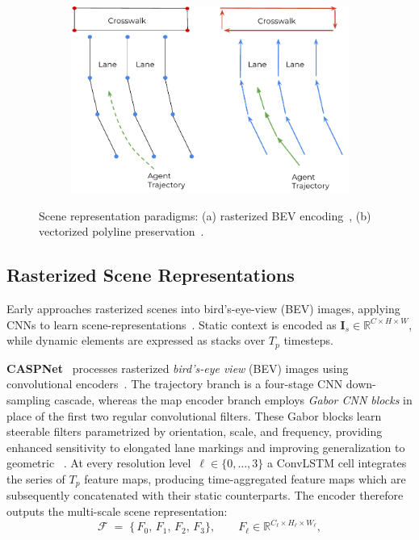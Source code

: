 \begin{figure}[H]
\begin{subfigure}[t]{0.35\textwidth}
    \label{fig:rasterized}
\end{subfigure}
\hfill
\begin{subfigure}[t]{0.37\textwidth}
    \centering
    \includegraphics[width=\textwidth]{figures/vectornet-2020-vector-repr.pdf}
    \label{fig:vectorized}
\end{subfigure}
\caption{Scene representation paradigms: (a) rasterized BEV encoding~\cite{caspnetSchaefer2022}, (b) vectorized polyline preservation~\cite{gao2020vectornet}.}
\label{fig:scene_representations}
\end{figure}

\subsection{Rasterized Scene Representations}
Early approaches rasterized scenes into bird's-eye-view (BEV) images, applying CNNs to learn scene-representations~\cite{cui2019multimodal,chai2019multipath}. Static context is encoded as \(\mathbf{I}_s \in \mathbb{R}^{C \times H \times W}\), while dynamic elements are expressed as stacks over \(T_p\) timesteps.

\textbf{CASPNet}~\cite{caspnetSchaefer2022} processes rasterized \emph{bird's-eye view} (BEV) images using convolutional encoders~\cite{Luan2018GCNN}. The trajectory branch is a four-stage CNN down-sampling cascade, whereas the map encoder branch employs \emph{Gabor CNN blocks} in place of the first two regular convolutional filters. These Gabor blocks learn steerable filters parametrized by orientation, scale, and frequency, providing enhanced sensitivity to elongated lane markings and improving generalization to geometric ~\cite{Luan2018GCNN}. At every resolution level~\( \ell \in \{0, \ldots, 3 \} \) a ConvLSTM cell integrates the series of \( T_p \) feature maps, producing time-aggregated feature maps which are subsequently concatenated with their static counterparts.
 The encoder therefore outputs the multi-scale scene representation:
\begin{equation}
\label{eq:caspnet_scene_repr}
\mathcal{F}
  \;=\;
  \bigl\{\,F_{0},\,F_{1},\,F_{2},\,F_{3}\bigr\},
\qquad
F_{\ell}\in\mathbb{R}^{C_{\ell}\times H_{\ell}\times W_{\ell}},
\end{equation}


